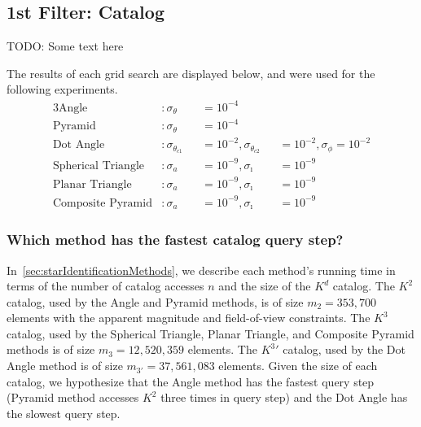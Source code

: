 \subsection{1st Filter: Catalog}\label{subsec:1stFilter:Catalog}
 TODO: Some text here %

The results of each grid search are displayed below, and were used for the following experiments.
\begin{alignat*}{3} %
    \text{Angle}&: \sigma_\theta &&= 10^{-4} &&{}\\
    \text{Pyramid}&: \sigma_\theta &&= 10^{-4} &&{} \\
    \text{Dot Angle}&: \sigma_{\theta_{c1}} &&= 10^{-2}, \sigma_{\theta_{c2}} &&= 10^{-2}, \sigma_\phi = 10^{-2} \\
    \text{Spherical Triangle}&: \sigma_a &&= 10^{-9}, \sigma_\imath &&= 10^{-9} \\
    \text{Planar Triangle}&: \sigma_a &&= 10^{-9}, \sigma_\imath &&= 10^{-9} \\
    \text{Composite Pyramid}&: \sigma_a &&= 10^{-9}, \sigma_\imath &&= 10^{-9}
\end{alignat*}

\begin{table}
\end{table}

\subsubsection{Which method has the fastest catalog query step?}
In~\autoref{sec:starIdentificationMethods}, we describe each method's running time in terms of the number of catalog
accesses $n$ and the size of the $K^d$ catalog.
The $K^2$ catalog, used by the Angle and Pyramid methods, is of size $m_2 = 353,700$ elements with the apparent
magnitude and field-of-view constraints.
The $K^3$ catalog, used by the Spherical Triangle, Planar Triangle, and Composite Pyramid methods is of size
$m_3 = 12,520,359$ elements.
The $K^3'$ catalog, used by the Dot Angle method is of size $m_{3'} = 37,561,083$ elements.
Given the size of each catalog, we hypothesize that the Angle method has the fastest query step
(Pyramid method accesses $K^2$ three times in query step) and the Dot Angle has the slowest query step.

